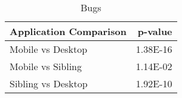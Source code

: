 \begin{table}[ht]
\centering
\caption{Bugs} 
\begin{tabular}{lr}
  \hline
Application Comparison & p-value \\ 
  \hline
Mobile vs Desktop & 1.38E-16 \\ 
  Mobile vs Sibling & 1.14E-02 \\ 
  Sibling vs Desktop & 1.92E-10 \\ 
   \hline
\end{tabular}
\end{table}
